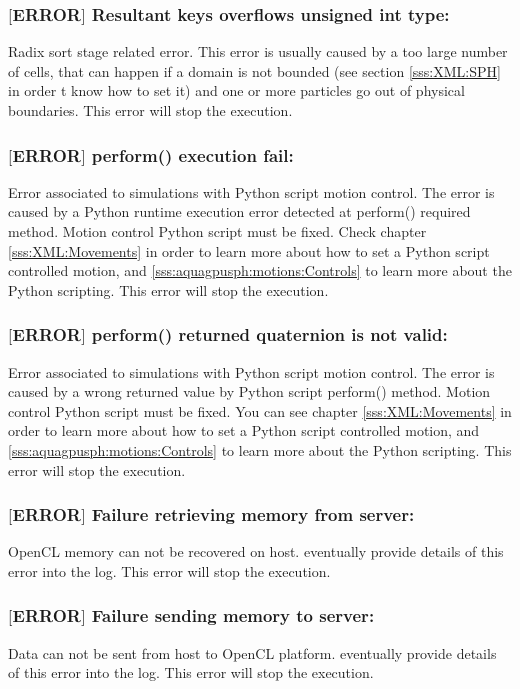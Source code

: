 \subsubsection{$[$ERROR$]$ Resultant keys overflows unsigned int type:}
%
Radix sort stage related error. This error is usually caused by a too large number
of cells, that can happen if a domain is not bounded (see section \ref{sss:XML:SPH} in order t
know how to set it) and one or more particles go out of physical boundaries.\rc
This error will stop the \NAME execution.
%
\subsubsection{$[$ERROR$]$ perform() execution fail:}
%
Error associated to simulations with Python script motion control. The error is
caused by a Python runtime execution error detected at perform() required method.
Motion control Python script must be fixed.\rc
Check chapter \ref{sss:XML:Movements} in order to learn more about how to set a Python script
controlled motion, and \ref{sss:aquagpusph:motions:Controls} to learn more about the Python scripting.\rc 
This error will stop the \NAME execution.
%
\subsubsection{$[$ERROR$]$ perform() returned quaternion is not valid:}
%
Error associated to simulations with Python script motion control. The error is
caused by a wrong returned value by Python script perform() method.
Motion control Python script must be fixed.\rc
You can see chapter \ref{sss:XML:Movements} in order to learn more about how to set a Python script
controlled motion, and \ref{sss:aquagpusph:motions:Controls} to learn more about the Python scripting.\rc 
This error will stop the \NAME execution.
%
\subsubsection{$[$ERROR$]$ Failure retrieving memory from server:}
%
OpenCL memory can not be recovered on host. \NAME eventually provide details
of this error into the log.\rc
This error will stop the \NAME execution.
%
\subsubsection{$[$ERROR$]$ Failure sending memory to server:}
%
Data can not be sent from host to OpenCL platform. \NAME eventually provide details
of this error into the log.\rc
This error will stop the \NAME execution.
%
